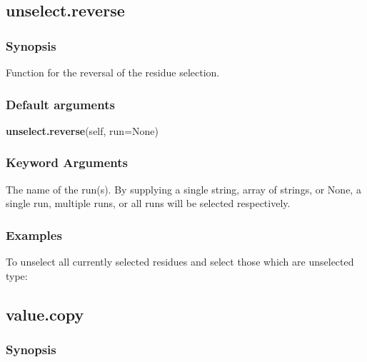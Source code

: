 




\newpage

\subsection{unselect.reverse}


\subsubsection{Synopsis}

Function for the reversal of the residue selection.

\subsubsection{Default arguments}

\textsf{\textbf{unselect.reverse}(self, run=None)}


\subsubsection{Keyword Arguments}

  The name of the run(s).  By supplying a single string, array of strings, or None, a single run, multiple runs, or all runs will be selected respectively.

\subsubsection{Examples}

To unselect all currently selected residues and select those which are unselected type:




\newpage

\subsection{value.copy}


\subsubsection{Synopsis}

